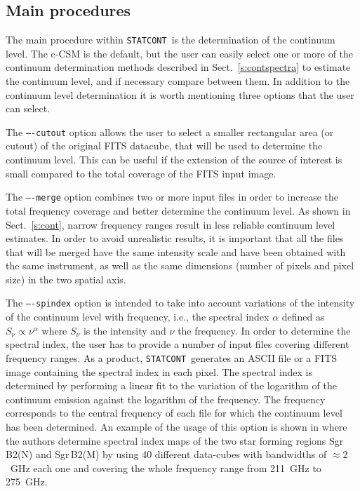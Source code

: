 \documentclass{aa}
\newcommand{\statcont} {\texttt{STATCONT}}
\begin{document}
\subsection{Main procedures}\label{s:tasks}

The main procedure within \statcont\ is the determination of the continuum level. The c-CSM is the default, but the user can easily select one or more of the continuum determination methods described in Sect.~\ref{s:contspectra} to estimate the continuum level, and if necessary compare between them. In addition to the continuum level determination it is worth mentioning three options that the user can select.

The \texttt{----cutout} option allows the user to select a smaller rectangular area (or cutout) of the original FITS datacube, that will be used to determine the continuum level. This can be useful if the extension of the source of interest is small compared to the total coverage of the FITS input image.

The \texttt{----merge} option combines two or more input files in order to increase the total frequency coverage and better determine the continuum level. As shown in Sect.~\ref{s:cont}, narrow frequency ranges result in less reliable continuum level estimates. In order to avoid unrealistic results, it is important that all the files that will be merged have the same intensity scale and have been obtained with the same instrument, as well as the same dimensions (number of pixels and pixel size) in the two spatial axis.

The \texttt{----spindex} option is intended to take into account variations of the intensity of the continuum level with frequency, i.e., the spectral index $\alpha$ defined as $S_\nu\propto\nu^\alpha$ where $S_\nu$ is the intensity and $\nu$ the frequency. In order to determine the spectral index, the user has to provide a number of input files covering different frequency ranges. As a product, \statcont\ generates an ASCII file or a FITS image containing the spectral index in each pixel. The spectral index is determined by performing a linear fit to the variation of the logarithm of the continuum emission against the logarithm of the frequency. The frequency corresponds to the central frequency of each file for which the continuum level has been determined. An example of the usage of this option is shown in \citet[their Fig.~7]{SanchezMonge2017} where the authors determine spectral index maps of the two star forming regions Sgr\,B2(N) and Sgr\,B2(M) by using 40 different data-cubes with bandwidths of $\approx2$~GHz each one and covering the whole frequency range from 211~GHz to 275~GHz.
\end{document}
